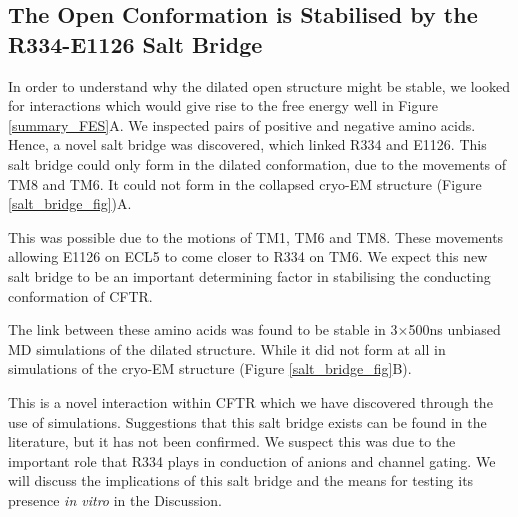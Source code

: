 \subsection{The Open Conformation is Stabilised by the R334-E1126 Salt Bridge}
\label{salt_bridge}

In order to understand why the dilated open structure might be stable, we looked for interactions which would give rise to the free energy well in Figure \ref{summary_FES}A. We inspected pairs of positive and negative amino acids. Hence, a novel salt bridge was discovered, which linked R334 and  E1126. This salt bridge could only form in the dilated conformation, due to the movements of TM8 and TM6. It could not form in the collapsed cryo-EM structure (Figure \ref{salt_bridge_fig})A. 

This was possible due to the motions of TM1, TM6 and TM8. These movements allowing E1126 on ECL5 to come closer to R334 on TM6. We expect this new salt bridge to be an important determining factor in stabilising the conducting conformation of CFTR.  

The link between these amino acids was found to be stable in 3$\times$500ns unbiased MD simulations of the dilated structure. While it did not form at all in simulations of the cryo-EM structure (Figure \ref{salt_bridge_fig}B).

This is a novel interaction within CFTR which we have discovered through the use of simulations. Suggestions that this salt bridge exists can be found in the literature, but it has not been confirmed. We suspect this was due to the important role that R334 plays in conduction of anions and channel gating. We will discuss the implications of this salt bridge and the means for testing its presence \textit{in vitro} in the Discussion.

